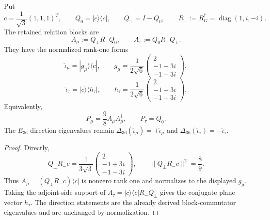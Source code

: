 \documentclass[12pt,a4paper]{article}
\begin{document}
\begin{theorem}
\label{p6:thm:v597-hopf-pcad-lepton-rays}
Put
\[
 c=\frac1{\sqrt3}(1,1,1)^T,
 \qquad Q_0=|c\rangle\langle c|,
 \qquad Q_\perp=I-Q_0,
 \qquad R_-:=R_G^\dagger=\operatorname{diag}(1,i,-i).
\]
The retained relation blocks are
\[
 A_\mu:=Q_\perp R_-Q_0,
 \qquad A_\tau:=Q_0R_-Q_\perp.
\]
They have the normalized rank-one forms
\[
 \boxed{\widehat\iota_\mu=|g_\mu\rangle\langle c|,
 \qquad
 g_\mu=\frac1{2\sqrt6}
 \begin{pmatrix}2\\-1+3i\\-1-3i\end{pmatrix},}
\]
\[
 \boxed{\widehat\iota_\tau=|c\rangle\langle h_\tau|,
 \qquad
 h_\tau=\frac1{2\sqrt6}
 \begin{pmatrix}2\\-1-3i\\-1+3i\end{pmatrix}.}
\]
Equivalently,
\[
 \boxed{P_\mu=\frac98A_\mu A_\mu^\dagger,
 \qquad P_\tau=Q_0.}
\]
The $E_{36}$ direction eigenvalues remain
$\Delta_{36}(\widehat\iota_\mu)=+\widehat\iota_\mu$ and
$\Delta_{36}(\widehat\iota_\tau)=-\widehat\iota_\tau$.
\end{theorem}
\begin{proof}
Directly,
\[
 Q_\perp R_-c
 =\frac1{3\sqrt3}
 \begin{pmatrix}2\\-1+3i\\-1-3i\end{pmatrix},
 \qquad
 \|Q_\perp R_-c\|^2=\frac89.
\]
Thus $A_\mu=(Q_\perp R_-c)\langle c|$ is nonzero rank one and normalizes to
the displayed $g_\mu$.  Taking the adjoint-side support of
$A_\tau=|c\rangle\langle c|R_-Q_\perp$ gives the conjugate plane vector
$h_\tau$.  The direction statements are the already derived block-commutator
eigenvalues and are unchanged by normalization.
\end{proof}
\end{document}
